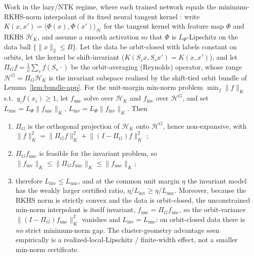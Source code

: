 \begin{theorem}\label{thm:lazy-cluster-app}
Work in the lazy/NTK regime, where each trained network equals the
minimum-RKHS-norm interpolant of its fixed neural tangent kernel
\citep{jacot2018neural}: write $K(x,x')=\langle\Phi(x),\Phi(x')\rangle_{\mathcal H}$
for the tangent kernel with feature map $\Phi$ and RKHS $\mathcal H_K$, and assume
a smooth activation so that $\Phi$ is $L_\Phi$-Lipschitz on the data ball
$\{\lVert x\rVert_2\le B\}$. Let the data be orbit-closed with labels constant on
orbits, let the kernel be shift-invariant ($K(S_sx,S_sx')=K(x,x')$), and let
$\Pi_Gf=\tfrac1\dd\sum_sf(S_s\cdot)$ be the orbit-averaging (Reynolds) operator,
whose range $\mathcal H^G=\Pi_G\mathcal H_K$ is the invariant subspace realized by
the shift-tied orbit bundle of Lemma~\ref{lem:bundle-app}. For the unit-margin
min-norm problem $\min_f\lVert f\rVert_K$ s.t.\ $y_if(x_i)\ge1$, let
$f_{\mathrm{unc}}$ solve over $\mathcal H_K$ and $f_{\mathrm{inv}}$ over
$\mathcal H^G$, and set $L_{\mathrm{unc}}=L_\Phi\lVert f_{\mathrm{unc}}\rVert_K$,
$L_{\mathrm{inv}}=L_\Phi\lVert f_{\mathrm{inv}}\rVert_K$. Then
\begin{enumerate}[leftmargin=1.7em,label=\textup{(\roman*)}]
\item $\Pi_G$ is the orthogonal projection of $\mathcal H_K$ onto $\mathcal H^G$,
hence non-expansive, with
$\lVert f\rVert_K^2=\lVert\Pi_Gf\rVert_K^2+\lVert(I-\Pi_G)f\rVert_K^2$
\citep{elesedy2021provably};
\item $\Pi_Gf_{\mathrm{unc}}$ is feasible for the invariant problem, so
$\lVert f_{\mathrm{inv}}\rVert_K\le\lVert\Pi_Gf_{\mathrm{unc}}\rVert_K\le\lVert f_{\mathrm{unc}}\rVert_K$;
\item therefore $L_{\mathrm{inv}}\le L_{\mathrm{unc}}$, and at the common unit
margin $\eta$ the invariant model has the weakly larger certified ratio,
$\eta/L_{\mathrm{inv}}\ge\eta/L_{\mathrm{unc}}$. Moreover, because the RKHS norm
is strictly convex and the data is orbit-closed, the unconstrained min-norm
interpolant is itself invariant, $f_{\mathrm{unc}}=\Pi_Gf_{\mathrm{unc}}$, so the
orbit-variance $\lVert(I-\Pi_G)f_{\mathrm{unc}}\rVert_K^2$ vanishes and
$L_{\mathrm{inv}}=L_{\mathrm{unc}}$: on orbit-closed data there is \emph{no}
strict minimum-norm gap. The cluster-geometry advantage seen empirically is a
realized-local-Lipschitz / finite-width effect, not a smaller min-norm
certificate.
\end{enumerate}
\end{theorem}

